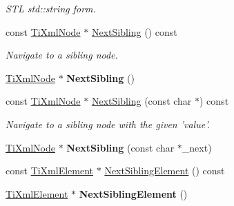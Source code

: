 \begin{DoxyCompactItemize}
\begin{DoxyCompactList}\small\item\em STL std::string form. \item\end{DoxyCompactList}\item 
\hypertarget{class_ti_xml_node_af854baeba384f5fe9859f5aee03b548e}{
const \hyperlink{class_ti_xml_node}{TiXmlNode} $\ast$ \hyperlink{class_ti_xml_node_af854baeba384f5fe9859f5aee03b548e}{NextSibling} () const }
\label{class_ti_xml_node_af854baeba384f5fe9859f5aee03b548e}

\begin{DoxyCompactList}\small\item\em Navigate to a sibling node. \item\end{DoxyCompactList}\item 
\hypertarget{class_ti_xml_node_a4d05f7b1d7b470ac6887edd072d4892a}{
\hyperlink{class_ti_xml_node}{TiXmlNode} $\ast$ {\bfseries NextSibling} ()}
\label{class_ti_xml_node_a4d05f7b1d7b470ac6887edd072d4892a}

\item 
\hypertarget{class_ti_xml_node_a2e61c0b89a77e36a0e8c60490003cb46}{
const \hyperlink{class_ti_xml_node}{TiXmlNode} $\ast$ \hyperlink{class_ti_xml_node_a2e61c0b89a77e36a0e8c60490003cb46}{NextSibling} (const char $\ast$) const }
\label{class_ti_xml_node_a2e61c0b89a77e36a0e8c60490003cb46}

\begin{DoxyCompactList}\small\item\em Navigate to a sibling node with the given 'value'. \item\end{DoxyCompactList}\item 
\hypertarget{class_ti_xml_node_a4080bc5cc8a5c139e7cf308669e850fc}{
\hyperlink{class_ti_xml_node}{TiXmlNode} $\ast$ {\bfseries NextSibling} (const char $\ast$\_\-next)}
\label{class_ti_xml_node_a4080bc5cc8a5c139e7cf308669e850fc}

\item 
const \hyperlink{class_ti_xml_element}{TiXmlElement} $\ast$ \hyperlink{class_ti_xml_node_a73acf929d49d10bd0e5fb3d31b0372d1}{NextSiblingElement} () const 
\item 
\hypertarget{class_ti_xml_node_a1b211cb5034655a04358e0e2f6fc5010}{
\hyperlink{class_ti_xml_element}{TiXmlElement} $\ast$ {\bfseries NextSiblingElement} ()}
\label{class_ti_xml_node_a1b211cb5034655a04358e0e2f6fc5010}


\end{DoxyCompactItemize}
